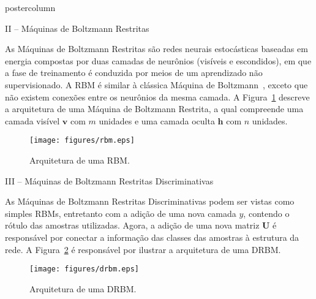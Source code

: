 \documentclass[final,hyperref={pdfpagelabels=false}]{beamer}
\begin{document}
\begin{frame}
\begin{columns}
\begin{column}{.45\textwidth}
\begin{beamercolorbox}[center,wd=\textwidth]{postercolumn}
\begin{minipage}[T]{.95\textwidth}
{             \begin{block}{\vspace*{-7pt} \large II -- Máquinas de Boltzmann Restritas}
				\begin{itemize}
				
				{\small \item As Máquinas de Boltzmann Restritas são redes neurais estocásticas baseadas em energia compostas por duas camadas de neurônios (visíveis e escondidos), em que a fase de treinamento é conduzida por meios de um aprendizado não supervisionado. A RBM é similar à clássica Máquina de Boltzmann~\cite{Ackley:88}, exceto que não existem conexões entre os neurônios da mesma camada. A Figura~\ref{f.rbm} descreve a arquitetura de uma Máquina de Boltzmann Restrita, a qual compreende uma camada visível $\textbf{v}$ com $m$ unidades e uma camada oculta $\textbf{h}$ com $n$ unidades.} \hspace*{20cm}

				\begin{figure}[ht]
\centering
  \texttt{[image: figures/rbm.eps]}
  \caption{Arquitetura de uma RBM.}
  \label{f.rbm}
\end{figure}				
				\end{itemize}
            \end{block}
                       
            \vspace*{14pt}
            
        \begin{block}{\vspace*{-7pt} III -- Máquinas de Boltzmann Restritas Discriminativas}
        
        \begin{itemize}
        	
        {\small \item As Máquinas de Boltzmann Restritas Discriminativas podem ser vistas como simples RBMs, entretanto com a adição de uma nova camada $y$, contendo o rótulo das amostras utilizadas. Agora, a adição de uma nova matriz $\textbf{U}$ é responsável por conectar a informação das classes das amostras à estrutura da rede. A Figura~\ref{f.drbm} é responsável por ilustrar a arquitetura de uma DRBM.} \hspace*{20cm}
        
        \begin{figure}[ht]
\centering
  \texttt{[image: figures/drbm.eps]}
  \caption{Arquitetura de uma DRBM.}
  \label{f.drbm}
\end{figure}
        

\end{itemize}
\end{block}}
\end{minipage}
\end{beamercolorbox}
\end{column}
\end{columns}
\end{frame}
\end{document}
